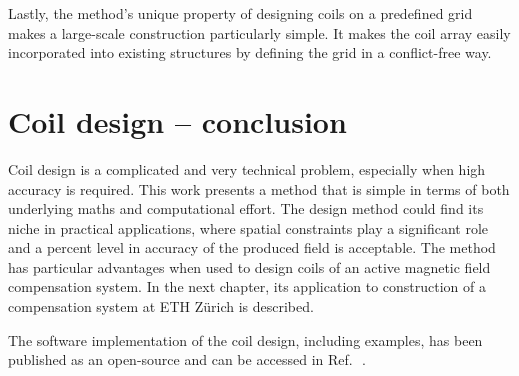 Lastly, the method's unique property of designing coils on a predefined grid makes a large-scale construction particularly simple.
It makes the coil array easily incorporated into existing structures by defining the grid in a conflict-free way.




\section*{Coil design -- conclusion}
Coil design is a complicated and very technical problem, especially when high accuracy is required. This work presents a method that is simple in terms of both underlying maths and computational effort.
The design method could find its niche in practical applications, where spatial constraints play a significant role and a percent level in accuracy of the produced field is acceptable.
The method has particular advantages when used to design coils of an active magnetic field compensation system.
In the next chapter, its application to construction of a compensation system at ETH Zürich is described.

\enlargethispage{2\baselineskip}
The software implementation of the coil design, including examples, has been published as an open-source and can be accessed in Ref.\,~\cite{Coilsjlcode}.
